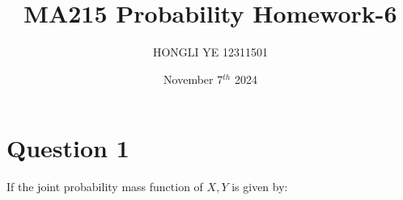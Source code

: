 \documentclass[hidelinks]{article}
\title{\textbf{MA215 Probability Homework-6}}
\author{HONGLI YE 12311501}
\date{November 7$^{th}$ 2024}
\begin{document}
\hypersetup{bookmarksnumbered=true,}
\pagecolor{white}
\color{black}
\maketitle


\SetAlgoNoLine %
\SetAlgoNoEnd %

\begin{Large}
\tableofcontents
\end{Large}%
\pagebreak

\section{Question 1}
If the joint probability mass function of $X, Y$ is given by:
\end{document}
